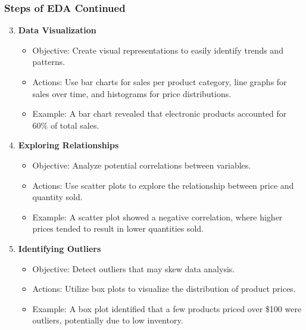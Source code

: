 \documentclass{beamer}
\begin{document}
\begin{frame}[fragile]
    \frametitle{Steps of EDA Continued}
    \begin{enumerate}
        \setcounter{enumi}{2}
        \item \textbf{Data Visualization}
            \begin{itemize}
                \item Objective: Create visual representations to easily identify trends and patterns.
                \item Actions: Use bar charts for sales per product category, line graphs for sales over time, and histograms for price distributions.
                \item Example: A bar chart revealed that electronic products accounted for 60\% of total sales.
            \end{itemize}

        \item \textbf{Exploring Relationships}
            \begin{itemize}
                \item Objective: Analyze potential correlations between variables.
                \item Actions: Use scatter plots to explore the relationship between price and quantity sold.
                \item Example: A scatter plot showed a negative correlation, where higher prices tended to result in lower quantities sold.
            \end{itemize}
        
        \item \textbf{Identifying Outliers}
            \begin{itemize}
                \item Objective: Detect outliers that may skew data analysis.
                \item Actions: Utilize box plots to visualize the distribution of product prices.
                \item Example: A box plot identified that a few products priced over \$100 were outliers, potentially due to low inventory.
            \end{itemize}
    \end{enumerate}
\end{frame}
\end{document}
